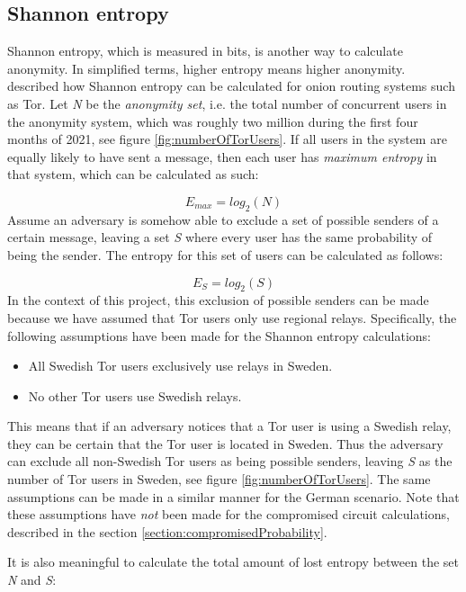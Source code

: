 \documentclass{kththesis}
\begin{document}
\subsection{Shannon entropy}
\label{section:shannonentropy}
Shannon entropy, which is measured in bits, is another way to calculate anonymity. In simplified terms, higher entropy means higher anonymity. \textcite{diaz2002towards} described how Shannon entropy can be calculated for onion routing systems such as Tor. Let \emph{N} be the \emph{anonymity set}, i.e. the total number of concurrent users in the anonymity system, which was roughly two million during the first four months of 2021, see figure \ref{fig:numberOfTorUsers}. If all users in the system are equally likely to have sent a message, then each user has \emph{maximum entropy} in that system, which can be calculated as such:

\[E_{max} = log_{2}(N)\]
Assume an adversary is somehow able to exclude a set of possible senders of a certain message, leaving a set \emph{S} where every user has the same probability of being the sender. The entropy for this set of users can be calculated as follows:

\[E_{S} = log_{2}(S)\]
In the context of this project, this exclusion of possible senders can be made because we have assumed that Tor users only use regional relays. Specifically, the following assumptions have been made for the Shannon entropy calculations:

\begin{itemize}
  \vspace{-0.2cm}\item All Swedish Tor users exclusively use relays in Sweden.
  \vspace{-0.2cm}\item No other Tor users use Swedish relays.
\end{itemize}

This means that if an adversary notices that a Tor user is using a Swedish relay, they can be certain that the Tor user is located in Sweden. Thus the adversary can exclude all non-Swedish Tor users as being possible senders, leaving \emph{S} as the number of Tor users in Sweden, see figure \ref{fig:numberOfTorUsers}. The same assumptions can be made in a similar manner for the German scenario. Note that these assumptions have \emph{not} been made for the compromised circuit calculations, described in the section \ref{section:compromisedProbability}.

It is also meaningful to calculate the total amount of lost entropy between the set \emph{N} and \emph{S}:
\end{document}
